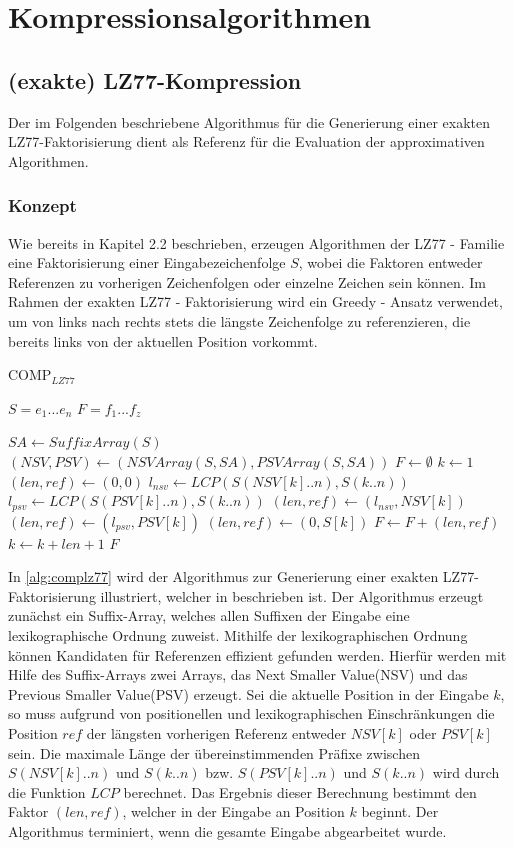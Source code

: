\chapter{Kompressionsalgorithmen}

\section{(exakte) LZ77-Kompression}
Der im Folgenden beschriebene Algorithmus für die Generierung einer exakten LZ77-Faktorisierung dient als Referenz für die Evaluation der approximativen Algorithmen.

\subsection{Konzept}
Wie bereits in Kapitel 2.2 beschrieben, erzeugen Algorithmen der LZ77 - Familie eine Faktorisierung einer Eingabezeichenfolge $S$, wobei die Faktoren entweder Referenzen
zu vorherigen Zeichenfolgen oder einzelne Zeichen sein können. Im Rahmen der exakten LZ77 - Faktorisierung wird ein Greedy - Ansatz verwendet, um von links nach rechts 
stets die längste Zeichenfolge zu referenzieren, die bereits links von der aktuellen Position vorkommt.
\begin{algorithm}[ht]
\centering
\caption{COMP$_{LZ77}$} \label{alg:complz77}
\algorithmicrequire $S=e_1...e_n$
\algorithmicensure $F=f_1...f_z$
\begin{algorithmic}
    \STATE $SA \gets SuffixArray(S)$
    \STATE $(NSV, PSV) \gets (NSVArray(S, SA), PSVArray(S, SA))$
    \STATE $F \gets \emptyset$
    \STATE $k \gets 1$
    \STATE $(len, ref) \gets (0, 0)$
    \STATE $l_{nsv} \gets LCP(S(NSV[k]..n), S(k..n))$
    \STATE $l_{psv} \gets LCP(S(PSV[k]..n), S(k..n))$
        \STATE $(len, ref) \gets (l_{nsv}, NSV[k])$
        \STATE $(len, ref) \gets (l_{psv}, PSV[k])$
    \ELSE
        \STATE $(len, ref) \gets (0, S[k])$
    \ENDIF
    \STATE $F \gets F + (len, ref)$
    \STATE $k \gets k + len + 1$
    \ENDWHILE
    \RETURN $F$
\end{algorithmic}
\end{algorithm}
In \ref{alg:complz77} wird der Algorithmus zur Generierung einer exakten LZ77-Faktorisierung illustriert, welcher in \cite{exactLemZiv} beschrieben ist. Der 
Algorithmus erzeugt zunächst ein Suffix-Array, welches allen Suffixen der Eingabe eine lexikographische Ordnung zuweist. Mithilfe der lexikographischen Ordnung 
können Kandidaten für Referenzen effizient gefunden werden. Hierfür werden mit Hilfe des Suffix-Arrays zwei Arrays, das Next Smaller Value(NSV) und das 
Previous Smaller Value(PSV) erzeugt. Sei die aktuelle Position in der Eingabe $k$, so muss aufgrund von positionellen und lexikographischen Einschränkungen die 
Position $ref$ der längsten vorherigen Referenz entweder $NSV[k]$ oder $PSV[k]$ sein. Die maximale Länge der übereinstimmenden Präfixe zwischen $S(NSV[k]..n)$ 
und $S(k..n)$ bzw. $S(PSV[k]..n)$ und $S(k..n)$ wird durch die Funktion $LCP$ berechnet. Das Ergebnis dieser Berechnung bestimmt den Faktor $(len, ref)$, 
welcher in der Eingabe an Position $k$ beginnt. Der Algorithmus terminiert, wenn die gesamte Eingabe abgearbeitet wurde.

